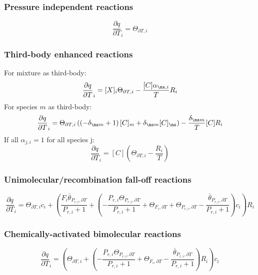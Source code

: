 \documentclass[a4paper,10pt]{article}
\begin{document}
\subsubsection{Pressure independent reactions}
\begin{dmath} \frac{\partial q }{\partial T }_{i} = \Theta_{\partial T, i}\end{dmath} 
\subsubsection{Third-body enhanced reactions}
For mixture as third-body:
\begin{dmath} \frac{\partial q }{\partial T }_{i} = [X]_{i} \Theta_{\partial T, i} - \frac{[C] \alpha_{\ns,i}}{T} R_{i}\end{dmath} 
For species $m$ as third-body:
\begin{dmath} \frac{\partial q }{\partial T }_{i} = \Theta_{\partial T, i} \left(\left(- \delta_{\ns m} + 1\right) [C]_{m} + \delta_{\ns m} [C]_{\ns}\right) - \frac{\delta_{\ns m}}{T} [C] R_{i}\end{dmath} 
If all $\alpha_{j,i} = 1$ for all species j:
\begin{dmath} \frac{\partial q }{\partial T }_{i} = [C] \left(\Theta_{\partial T, i} - \frac{R_{i}}{T}\right)\end{dmath} 
\subsubsection{Unimolecular\slash recombination fall-off reactions}
\begin{dmath} \frac{\partial q }{\partial T }_{i} = \Theta_{\partial T, i} c_{i} + \left(\frac{F_{i} \bar{\theta}_{P_{r, i}, \partial T}}{P_{r, i} + 1} + \left(- \frac{P_{r, i} \Theta_{P_{r,i}, \partial T}}{P_{r, i} + 1} + \Theta_{F_i, \partial T} + \Theta_{P_{r,i}, \partial T} - \frac{\bar{\theta}_{P_{r, i}, \partial T}}{P_{r, i} + 1}\right) c_{i}\right) R_{i}\end{dmath} 
\subsubsection{Chemically-activated bimolecular reactions}
\begin{dmath} \frac{\partial q }{\partial T }_{i} = \left(\Theta_{\partial T, i} + \left(- \frac{P_{r, i} \Theta_{P_{r,i}, \partial T}}{P_{r, i} + 1} + \Theta_{F_i, \partial T} - \frac{\bar{\theta}_{P_{r, i}, \partial T}}{P_{r, i} + 1}\right) R_{i}\right) c_{i}\end{dmath} 
\end{document}
